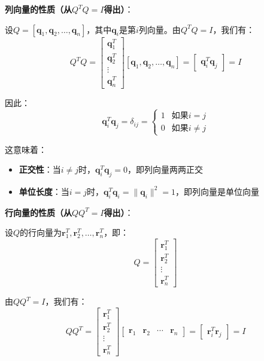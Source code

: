 \documentclass[12pt,a4paper]{article}
\begin{document}
\textbf{列向量的性质（从$Q^T Q = I$得出）}：

设$Q = [\bm{q}_1, \bm{q}_2, \ldots, \bm{q}_n]$，其中$\bm{q}_i$是第$i$列向量。由$Q^T Q = I$，我们有：
\begin{equation}
Q^T Q = \begin{bmatrix} \bm{q}_1^T \\ \bm{q}_2^T \\ \vdots \\ \bm{q}_n^T \end{bmatrix} [\bm{q}_1, \bm{q}_2, \ldots, \bm{q}_n] = \begin{bmatrix} \bm{q}_i^T \bm{q}_j \end{bmatrix} = I
\end{equation}

因此：
\begin{equation}
\bm{q}_i^T \bm{q}_j = \delta_{ij} = \begin{cases} 1 & \text{如果} i = j \\ 0 & \text{如果} i \neq j \end{cases}
\end{equation}

这意味着：
\begin{itemize}
\item \textbf{正交性}：当$i \neq j$时，$\bm{q}_i^T \bm{q}_j = 0$，即列向量两两正交
\item \textbf{单位长度}：当$i = j$时，$\bm{q}_i^T \bm{q}_i = \|\bm{q}_i\|^2 = 1$，即列向量是单位向量
\end{itemize}

\textbf{行向量的性质（从$Q Q^T = I$得出）}：

设$Q$的行向量为$\bm{r}_1^T, \bm{r}_2^T, \ldots, \bm{r}_n^T$，即：
\begin{equation}
Q = \begin{bmatrix} \bm{r}_1^T \\ \bm{r}_2^T \\ \vdots \\ \bm{r}_n^T \end{bmatrix}
\end{equation}

由$Q Q^T = I$，我们有：
\begin{equation}
Q Q^T = \begin{bmatrix} \bm{r}_1^T \\ \bm{r}_2^T \\ \vdots \\ \bm{r}_n^T \end{bmatrix} \begin{bmatrix} \bm{r}_1 & \bm{r}_2 & \cdots & \bm{r}_n \end{bmatrix} = \begin{bmatrix} \bm{r}_i^T \bm{r}_j \end{bmatrix} = I
\end{equation}
\end{document}
